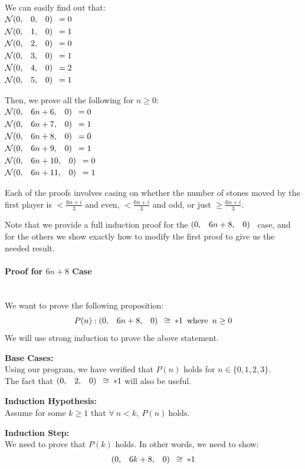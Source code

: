 \documentclass{article}
\makeatletter
\newcommand{\nim}{\mathcal{N}}
\newcommand{\game}[3]{\begin{array}{@{}*6r}(#1, & #2, & #3)\end{array}}
\newcommand{\gcong}{\cong\:}
\makeatother
\begin{document}
We can easily find out that: \\
$\nim\game{0}{0}{0} = 0$ \\
$\nim\game{0}{1}{0} = 1$ \\
$\nim\game{0}{2}{0} = 0$ \\
$\nim\game{0}{3}{0} = 1$ \\
$\nim\game{0}{4}{0} = 2$ \\
$\nim\game{0}{5}{0} = 1$
\bigskip

Then, we prove all the following for $n \geq 0$: \\
$\nim\game{0}{6n+6}{0} = 0$ \\
$\nim\game{0}{6n+7}{0} = 1$ \\
$\nim\game{0}{6n+8}{0} = 0$ \\
$\nim\game{0}{6n+9}{0} = 1$ \\
$\nim\game{0}{6n+10}{0} = 0$ \\
$\nim\game{0}{6n+11}{0} = 1$
\bigskip

Each of the proofs involves casing on whether the number of
stones moved by the first player is
$< \frac{6n+i}{3}$ and even, $< \frac{6n+i}{3}$ and odd, or
just $\geq \frac{6n+i}{3}$.
\bigskip

Note that we provide a full induction proof for the
$\game{0}{6n+8}{0}$ case, and for the others we show exactly how
to modify the first proof to give us the needed result.
\newpage

\paragraph{Proof for $6n + 8$ Case}\mbox{}\\
We want to prove the following proposition:
\begin{equation*}
  P(n) : \game{0}{6n + 8}{0} \gcong *1 \enspace \text{where} \enspace n \geq 0
\end{equation*}
We will use strong induction to prove the above statement.

\bigskip
\textbf{Base Cases:} \\
Using our program, we have verified that $P(n)$ holds for
$n \in \{0, 1, 2, 3\}$. \\
The fact that $\game{0}{2}{0} \gcong *1$ will also be useful.

\bigskip
\textbf{Induction Hypothesis:} \\
Assume for some $k \geq 1$ that 
$\forall \: n < k, \: P(n) \: \text{holds}$.

\bigskip
\textbf{Induction Step:} \\
We need to prove that $P(k)$ holds. In other words, we need to show:
\begin{equation*}
  \game{0}{6k + 8}{0} \gcong *1
\end{equation*}
\end{document}
